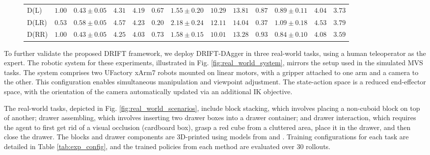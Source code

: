 \begin{figure*}[htbp]
\begin{minipage}{\textwidth}
{\begin{tabular}{l|cccc|cccc|cccc}
        D(L) & $\mathbf{1.00}$ & $0.43 \pm 0.05$ & $4.31$ & $4.19$
            & $0.67$ & $1.55  \pm 0.20$ & $10.29$ & $13.81$
            & $0.87$ & $0.89 \pm 0.11$ & $4.04$ & $3.73$\\ 

        D(LR) & $0.53$ & $0.58 \pm 0.05$ & $4.57$ & $4.23$
            & $0.20$ & $2.18 \pm 0.24$ & $12.11$ & $14.04$ 
            & $0.37$ & $1.09 \pm 0.18$ & $4.53$ & $3.79$\\ 

        D(RR) & $\mathbf{1.00}$ & $0.43 \pm 0.05$ & $4.25$ & $\mathbf{4.03}$ 
            & $0.73$ & $1.58 \pm 0.15$ & $\mathbf{10.01}$ & $\mathbf{13.28}$
            & $\mathbf{0.93}$ & $\mathbf{0.84 \pm 0.10}$ & $4.08$ & $\mathbf{3.59}$\\ 
        \hline
    \end{tabular}
    }
\end{minipage}

\end{figure*}

To further validate the proposed DRIFT framework, we deploy DRIFT-DAgger in three real-world tasks, using a human teleoperator as the expert. The robotic system for these experiments, illustrated in Fig. \ref{fig:real_world_system}, mirrors the setup used in the simulated MVS tasks. The system comprises two UFactory xArm7 robots mounted on linear motors, with a gripper attached to one arm and a camera to the other. This configuration enables simultaneous manipulation and viewpoint adjustment. The state-action space is a reduced end-effector space, with the orientation of the camera automatically updated via an additional IK objective.

The real-world tasks, depicted in Fig. \ref{fig:real_world_scenarios}, include block stacking, which involves placing a non-cuboid block on top of another; drawer assembling, which involves inserting two drawer boxes into a drawer container; and drawer interaction, which requires the agent to first get rid of a visual occlusion (cardboard box), grasp a red cube from a cluttered area, place it in the drawer, and then close the drawer. The blocks and drawer components are 3D-printed using models from \cite{lee2021beyond} and \cite{heo2023furniturebench}. Training configurations for each task are detailed in Table \ref{tab:exp_config}, and the trained policies from each method are evaluated over 30 rollouts.

